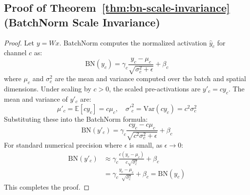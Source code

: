 \documentclass{article}
\theoremstyle{plain}
\theoremstyle{definition}
\theoremstyle{remark}
\begin{document}
\subsection{Proof of Theorem~\ref{thm:bn-scale-invariance} (BatchNorm Scale Invariance)}
\label{appendix:bn-scale-invariance-proof}
\begin{proof}
Let $y = Wx$. BatchNorm computes the normalized activation $\hat{y}_c$ for channel $c$ as:
\begin{equation}
    \text{BN}(y_c) = \gamma_c \frac{y_c - \mu_c}{\sqrt{\sigma^2_c + \epsilon}} + \beta_c
\end{equation}
where $\mu_c$ and $\sigma^2_c$ are the mean and variance computed over the batch and spatial dimensions. Under scaling by $c > 0$, the scaled pre-activations are $y'_c = c y_c$. The mean and variance of $y'_c$ are:
\begin{equation}
    \mu'_c = \mathbb{E}[c y_c] = c \mu_c, \quad \sigma'^2_c = \text{Var}(c y_c) = c^2 \sigma^2_c
\end{equation}
Substituting these into the BatchNorm formula:
\begin{equation}
    \text{BN}(y'_c) = \gamma_c \frac{c y_c - c \mu_c}{\sqrt{c^2 \sigma^2_c + \epsilon}} + \beta_c
\end{equation}
For standard numerical precision where $\epsilon$ is small, as $\epsilon \to 0$:
\begin{align}
    \text{BN}(y'_c) &\approx \gamma_c \frac{c (y_c - \mu_c)}{c \sqrt{\sigma^2_c}} + \beta_c \nonumber \\
    &= \gamma_c \frac{y_c - \mu_c}{\sqrt{\sigma^2_c}} + \beta_c = \text{BN}(y_c)
\end{align}
This completes the proof.
\end{proof}
\end{document}
